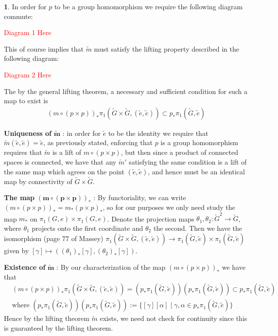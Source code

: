 \documentclass[10.5pt]{article}
\theoremstyle{definition}
\newtheorem{pb}{}
\newcommand{\set}[1]{\{#1\}}
\begin{document}
    \begin{pb}
        In order for \(p\) to be a group homomorphism we require the following diagram commute:

        \textcolor{red}{Diagram 1 Here}

        This of course implies that \(\tilde{m}\) must satisfy the lifting property described in the following diagram:

        \textcolor{red}{Diagram 2 Here}

        The by the general lifting theorem, a necessary and sufficient condition for such a map to exist is
        \begin{align*}
            (m\circ(p\times p))_*\pi_1(\tilde{G}\times\tilde{G},(\tilde{e},\tilde{e})) \subset p_* \pi_1(\tilde{G},\tilde{e})
        \end{align*}

        \textbf{Uniqueness of} \(\mathbf{\tilde{m}}\) :
        in order for \(\tilde{e}\) to be the identity we require that \(\tilde{m}(\tilde{e},\tilde{e}) = \tilde{e}\), as previously stated, enforcing that \(p\) is a group homomorphism requires that \(\tilde{m}\) is a lift of \(m \circ (p \times p)\), but then since a product of connected spaces is connected, we have that any \(\tilde{m}'\) satisfying the same condition is a lift of the same map which agrees on the point \((\tilde{e},\tilde{e})\), and hence must be an identical map by connectivity of \(\tilde{G}\times \tilde{G}\).

        \textbf{The map} \(\mathbf{(m \circ (p\times p))_*}\) : By functoriality, we can write 
        \((m \circ (p\times p))_* = m_* (p\times p)_*\), so for our purposes we only need study the map \(m_*\) on \(\pi_1(G,e) \times \pi_1(G,e)\). Denote the projection maps \(\theta_1,\theta_2: \tilde{G}^2 \to \tilde{G}\), where \(\theta_1\) projects onto the first coordinate and \(\theta_2\) the second. Then we have the isomorphism (page 77 of Massey) \(\pi_1(\tilde{G} \times \tilde{G},(\tilde{e},\tilde{e})) \to \pi_1(\tilde{G},\tilde{e}) \times \pi_1(\tilde{G},\tilde{e})\) given by \([\gamma] \mapsto ((\theta_1)_*[\gamma],(\theta_2)_*[\gamma])\).

        \textbf{Existence of }\(\mathbf{\tilde{m}}\) : By our characterization of the map \((m \circ (p\times p))_*\) we have that 
        \begin{align*}
            &(m \circ (p\times p))_*\pi_1(\tilde{G}\times\tilde{G},(\tilde{e},\tilde{e})) = (p_*\pi_1(\tilde{G},\tilde{e}))(p_*\pi_1(\tilde{G},\tilde{e})) \subset p_*\pi_1(\tilde{G},\tilde{e}) \\
            &\text{where } (p_*\pi_1(\tilde{G},\tilde{e}))(p_*\pi_1(\tilde{G},\tilde{e})) := \set{[\gamma][\alpha]\;\vert \; \gamma, \alpha \in p_*\pi_1(\tilde{G},\tilde{e})}
        \end{align*}
        Hence by the lifting theorem \(\tilde{m}\) exists, we need not check for continuity since this is guaranteed by the lifting theorem.


\end{pb}
\end{document}
